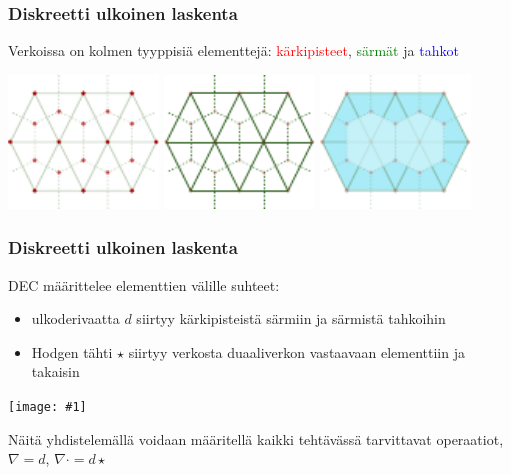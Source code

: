 \documentclass{beamer}
\newcommand{\img}[1]{
  \begin{center}
    \texttt{[image: \#1]}
  \end{center}
}
\begin{document}
\begin{frame}
  \frametitle{Diskreetti ulkoinen laskenta}

  Verkoissa on kolmen tyyppisiä elementtejä:
  \textcolor{red}{kärkipisteet}, \textcolor{green}{särmät} ja \textcolor{blue}{tahkot}

  \includegraphics[width=0.3\textwidth]{dec_mesh_vertices.pdf}
  \includegraphics[width=0.3\textwidth]{dec_mesh_edges.pdf}
  \includegraphics[width=0.3\textwidth]{dec_mesh_faces.pdf}
\end{frame}

\begin{frame}
  \frametitle{Diskreetti ulkoinen laskenta}

  DEC määrittelee elementtien välille suhteet:
  \begin{itemize}
    \item ulkoderivaatta $d$ siirtyy kärkipisteistä särmiin ja särmistä tahkoihin
    \item Hodgen tähti $\star$ siirtyy verkosta duaaliverkon vastaavaan elementtiin ja takaisin
  \end{itemize}

  \img{dec_operations.pdf}

  Näitä yhdistelemällä voidaan määritellä kaikki tehtävässä tarvittavat operaatiot,
  $\nabla = d$, $\nabla \cdot = d \star$
\end{frame}
\end{document}
